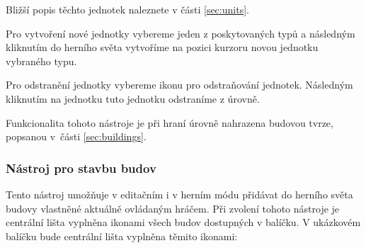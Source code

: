 \medskip
{}

\medskip
{}


\bigskip

Bližší popis těchto jednotek naleznete v části \ref{sec:units}.

Pro vytvoření nové jednotky vybereme jeden z poskytovaných typů a následným kliknutím do herního světa vytvoříme na pozici kurzoru novou jednotku vybraného typu.

Pro odstranění jednotky vybereme ikonu pro odstraňování jednotek. Následným kliknutím na jednotku tuto jednotku odstraníme z úrovně.

Funkcionalita tohoto nástroje je při hraní úrovně nahrazena budovou tvrze, popsanou v~části \ref{sec:buildings}.


\subsubsection{Nástroj pro stavbu budov}
\label{sec:buildingbuilder}
Tento nástroj umožňuje v editačním i v herním módu přidávat do herního světa budovy vlastněné aktuálně ovládaným hráčem. Při zvolení tohoto nástroje je centrální lišta vyplněna ikonami všech budov dostupných v balíčku. V ukázkovém balíčku bude centrální lišta vyplněna těmito ikonami:

\medskip
{}

\medskip
{}

